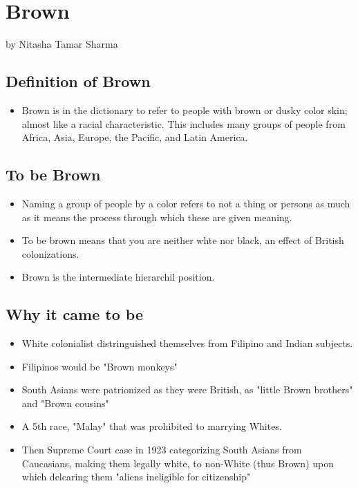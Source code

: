 \documentclass{article}
\begin{document}
  \section{Brown}
  by Nitasha Tamar Sharma

  \subsection{Definition of Brown}
  \begin{itemize}
    \item Brown is in the dictionary to refer to people
      with brown or dusky color skin;
      almost like a racial characteristic.
      This includes many groups of people from Africa, Asia, Europe,
      the Pacific, and Latin America.
  \end{itemize}

  \subsection{To be Brown}
  \begin{itemize}
    \item Naming a group of people by a color refers to not
      a thing or persons as much as it means the process through
      which these are given meaning.
    \item To be brown means that you are neither whte nor black,
      an effect of British colonizations.
    \item Brown is the intermediate hierarchil position.
  \end{itemize}

  \subsection{Why it came to be}
  \begin{itemize}
    \item White colonialist distringuished themselves from Filipino and
      Indian subjects.
    \item Filipinos would be "Brown monkeys"
    \item South Asians were patrionized as they were British,
      as "little Brown brothers" and "Brown cousins"
    \item A 5th race, "Malay" that was prohibited to marrying Whites.
    \item Then Supreme Court case in 1923 categorizing South Asians from
      Caucasians, making them legally white, to non-White (thus Brown)
      upon which delcaring them "aliens ineligible for citizenship"
  \end{itemize}
\end{document}
